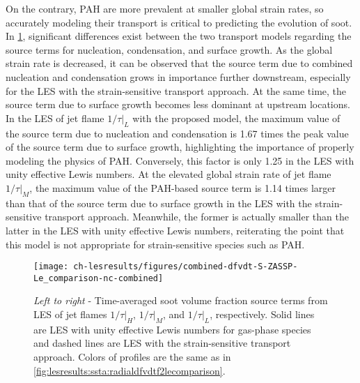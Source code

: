 On the contrary, PAH are more prevalent at smaller global strain rates, so accurately modeling their transport is critical to predicting the evolution of soot. In \cref{fig:lesresults:strain:allflamesdfvdt}, significant differences exist between the two transport models regarding the source terms for nucleation, condensation, and surface growth. As the global strain rate is decreased, it can be observed that the source term due to combined nucleation and condensation grows in importance further downstream, especially for the LES with the strain-sensitive transport approach. At the same time, the source term due to surface growth becomes less dominant at upstream locations. In the LES of jet flame $1/\tau|_L$ with the proposed model, the maximum value of the source term due to nucleation and condensation is 1.67 times the peak value of the source term due to surface growth, highlighting the importance of properly modeling the physics of PAH. Conversely, this factor is only 1.25 in the LES with unity effective Lewis numbers. At the elevated global strain rate of jet flame $1/\tau|_M$, the maximum value of the PAH-based source term is 1.14 times larger than that of the source term due to surface growth in the LES with the strain-sensitive transport approach. Meanwhile, the former is actually smaller than the latter in the LES with unity effective Lewis numbers, reiterating the point that this model is not appropriate for strain-sensitive species such as PAH.


\begin{figure}[htb]
  \centering
  \texttt{[image: ch-lesresults/figures/combined-dfvdt-S-ZASSP-Le\_comparison-nc-combined]}
  \caption[Centerline \texorpdfstring{$\langle df_V/dt \rangle$}{<dfV/dt>} from LES of Flames \texorpdfstring{$1/\tau|_H$}{1/t|H}, \texorpdfstring{$1/\tau|_M$}{1/t|M}, and \texorpdfstring{$1/\tau|_L$}{1/t|L} with Various Transport Approaches]{\textit{Left to right} - Time-averaged soot volume fraction source terms from LES of jet flames $1/\tau|_H$, $1/\tau|_M$, and $1/\tau|_L$, respectively. Solid lines are LES with unity effective Lewis numbers for gas-phase species and dashed lines are LES with the strain-sensitive transport approach. Colors of profiles are the same as in \cref{fig:lesresults:ssta:radialdfvdtf2lecomparison}.}
  \label{fig:lesresults:strain:allflamesdfvdt}
\end{figure}

